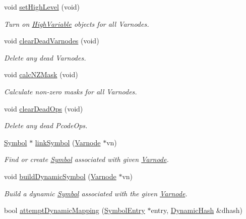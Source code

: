 \begin{DoxyCompactItemize}
void \mbox{\hyperlink{class_funcdata_afadeeb585ee8728c427fd6914b8bb7b1}{set\+High\+Level}} (void)
\begin{DoxyCompactList}\small\item\em Turn on \mbox{\hyperlink{class_high_variable}{High\+Variable}} objects for all Varnodes. \end{DoxyCompactList}\item 
void \mbox{\hyperlink{class_funcdata_a4096b0e76e9015f9aa61fa56cb85d79c}{clear\+Dead\+Varnodes}} (void)
\begin{DoxyCompactList}\small\item\em Delete any dead Varnodes. \end{DoxyCompactList}\item 
void \mbox{\hyperlink{class_funcdata_a5b338d2b2d1a72db73369e8631125ffd}{calc\+N\+Z\+Mask}} (void)
\begin{DoxyCompactList}\small\item\em Calculate {\itshape non-\/zero} masks for all Varnodes. \end{DoxyCompactList}\item 
void \mbox{\hyperlink{class_funcdata_adbb872f99bf69e4101034da41cdebd84}{clear\+Dead\+Ops}} (void)
\begin{DoxyCompactList}\small\item\em Delete any dead Pcode\+Ops. \end{DoxyCompactList}\item 
\mbox{\hyperlink{class_symbol}{Symbol}} $\ast$ \mbox{\hyperlink{class_funcdata_afbb3bc5ac9e2c09eda544db34b8f5879}{link\+Symbol}} (\mbox{\hyperlink{class_varnode}{Varnode}} $\ast$vn)
\begin{DoxyCompactList}\small\item\em Find or create \mbox{\hyperlink{class_symbol}{Symbol}} associated with given \mbox{\hyperlink{class_varnode}{Varnode}}. \end{DoxyCompactList}\item 
void \mbox{\hyperlink{class_funcdata_aa15db3d569027578de69c065fc607c63}{build\+Dynamic\+Symbol}} (\mbox{\hyperlink{class_varnode}{Varnode}} $\ast$vn)
\begin{DoxyCompactList}\small\item\em Build a {\itshape dynamic} \mbox{\hyperlink{class_symbol}{Symbol}} associated with the given \mbox{\hyperlink{class_varnode}{Varnode}}. \end{DoxyCompactList}\item 
bool \mbox{\hyperlink{class_funcdata_adeee32fc648486d26cd17ebb37bb118f}{attempt\+Dynamic\+Mapping}} (\mbox{\hyperlink{class_symbol_entry}{Symbol\+Entry}} $\ast$entry, \mbox{\hyperlink{class_dynamic_hash}{Dynamic\+Hash}} \&dhash)

\end{DoxyCompactItemize}
